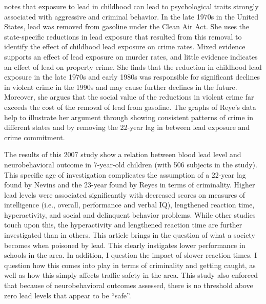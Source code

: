 \documentclass{article}
\begin{document}
\medskip

\noindent {}

\medskip

\cite{wolpaw2007environmental} notes that exposure to lead in childhood can lead to psychological traits strongly associated with aggressive and criminal behavior. In the late 1970s in the United States, lead was removed from gasoline under the Clean Air Act. She uses the state-specific reductions in lead exposure that resulted from this removal to identify the effect of childhood lead exposure on crime rates. Mixed evidence supports an effect of lead exposure on murder rates, and little evidence indicates an effect of lead on property crime. She finds that the reduction in childhood lead exposure in the late 1970s and early 1980s was responsible for significant declines in violent crime in the 1990s and may cause further declines in the future. Moreover, she argues that the social value of the reductions in violent crime far exceeds the cost of the removal of lead from gasoline. The graphs of Reye’s data help to illustrate her argument through showing consistent patterns of crime in different states and by removing the 22-year lag in between lead exposure and crime commitment. 

\medskip

\noindent {}

\medskip

The results of this 2007 study show a relation between blood lead level and neurobehavioral outcome in 7-year-old children (with 506 subjects  in the study). This specific age of investigation complicates the assumption of a 22-year lag found by Nevins and the 23-year found by Reyes in terms of criminality. Higher lead levels were associated significantly with decreased scores on measures of intelligence (i.e., overall, performance and verbal IQ), lengthened reaction time, hyperactivity, and social and delinquent behavior problems. While other studies touch upon this, the hyperactivity and lengthened reaction time are further investigated than in others. This article brings in the question of what a society becomes when poisoned by lead. This clearly instigates lower performance in schools in the area. In addition, I question the impact of slower reaction times. I question how this comes into play in terms of criminality and getting caught, as well as how this simply affects traffic safety in the area. This study also enforced that because of neurobehavioral outcomes assessed, there is no threshold above zero lead levels that appear to be ``safe''.
\end{document}
